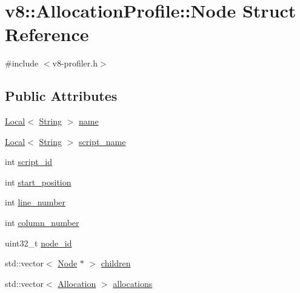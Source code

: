 \hypertarget{structv8_1_1AllocationProfile_1_1Node}{}\section{v8\+:\+:Allocation\+Profile\+:\+:Node Struct Reference}
\label{structv8_1_1AllocationProfile_1_1Node}


{\ttfamily \#include $<$v8-\/profiler.\+h$>$}

\subsection*{Public Attributes}
\begin{DoxyCompactItemize}
\item 
\mbox{\hyperlink{classv8_1_1Local}{Local}}$<$ \mbox{\hyperlink{classv8_1_1String}{String}} $>$ \mbox{\hyperlink{structv8_1_1AllocationProfile_1_1Node_af9f2c323d6a11e836c02e8ac88adc5a8}{name}}
\item 
\mbox{\hyperlink{classv8_1_1Local}{Local}}$<$ \mbox{\hyperlink{classv8_1_1String}{String}} $>$ \mbox{\hyperlink{structv8_1_1AllocationProfile_1_1Node_acd6567ac06a0bae713390559128e9c62}{script\+\_\+name}}
\item 
int \mbox{\hyperlink{structv8_1_1AllocationProfile_1_1Node_a4a746de878d9ad42b32fda4c365b98fb}{script\+\_\+id}}
\item 
int \mbox{\hyperlink{structv8_1_1AllocationProfile_1_1Node_a6caceefbf826a0425adc74331cc7a910}{start\+\_\+position}}
\item 
int \mbox{\hyperlink{structv8_1_1AllocationProfile_1_1Node_ac9773c92a3af3a9a9420337599e68bd9}{line\+\_\+number}}
\item 
int \mbox{\hyperlink{structv8_1_1AllocationProfile_1_1Node_a7cf86acc298428c858673fc1f9dbe305}{column\+\_\+number}}
\item 
uint32\+\_\+t \mbox{\hyperlink{structv8_1_1AllocationProfile_1_1Node_aa2a43ec43107692b2cfcb3b2b00aa801}{node\+\_\+id}}
\item 
std\+::vector$<$ \mbox{\hyperlink{structv8_1_1AllocationProfile_1_1Node}{Node}} $\ast$ $>$ \mbox{\hyperlink{structv8_1_1AllocationProfile_1_1Node_a176673c0440cb1baaf7713e14da84db0}{children}}
\item 
std\+::vector$<$ \mbox{\hyperlink{structv8_1_1AllocationProfile_1_1Allocation}{Allocation}} $>$ \mbox{\hyperlink{structv8_1_1AllocationProfile_1_1Node_a6ee0934b35ba77fb5d8b53f02d5a3068}{allocations}}
\end{DoxyCompactItemize}



